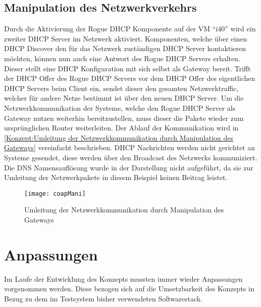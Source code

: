 \subsection{Manipulation des Netzwerkverkehrs}
Durch die Aktivierung der Rogue \ac{DHCP} Komponente auf der \ac{VM} "`i40"' wird ein zweiter \ac{DHCP} Server im Netzwerk aktiviert. Komponenten, welche über einen \ac{DHCP} Discover den für das Netzwerk zuständigen \ac{DHCP} Server kontaktieren möchten, können nun auch eine Antwort des Rogue \ac{DHCP} Servers erhalten. Dieser stellt eine \ac{DHCP} Konfiguration mit sich selbst als Gateway bereit. Trifft der \ac{DHCP} Offer des Rogue \ac{DHCP} Servers vor dem \ac{DHCP} Offer des eigentlichen \ac{DHCP} Servers beim Client ein, sendet dieser den gesamten Netzwerktraffic, welcher für andere Netze bestimmt ist über den neuen \ac{DHCP} Server. Um die Netzwerkkommunikation der Systeme, welche den Rogue \ac{DHCP} Server als Gateway nutzen weiterhin bereitzustellen, muss dieser die Pakete wieder zum ursprünglichen Router weiterleiten. Der Ablauf der Kommunikation wird in \autoref{Konzept:Umleitung der Netzwerkkommunikation durch Manipulation des Gateways} vereinfacht beschrieben. \ac{DHCP} Nachrichten werden nicht gerichtet an Systeme gesendet, diese werden über den Broadcast des Netzwerks kommuniziert. Die \ac{DNS} Namensauflösung wurde in der Darstellung nicht aufgeführt, da sie zur Umleitung der Netzwerkpakete in diesem Beispiel keinen Beitrag leistet.

\begin{figure}[h]
  \centering
  \texttt{[image: coapMani]}
  \caption{Umleitung der Netzwerkkommunikation durch Manipulation des Gateways} 
  \label{Konzept:Umleitung der Netzwerkkommunikation durch Manipulation des Gateways}
\end{figure}

\section{Anpassungen}
\label{Konzept:Anpassungen}
Im Laufe der Entwicklung des Konzepts mussten immer wieder Anpassungen vorgenommen werden. Diese bezogen sich auf die Umsetzbarkeit des Konzepts in Bezug zu dem im Testsystem bisher verwendeten Softwarestack. 

